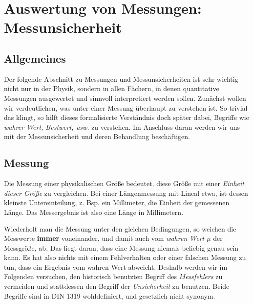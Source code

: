 \chapter{Auswertung von Messungen: Messunsicherheit} \label{v:fehler}

\section{Allgemeines}

Der folgende Abschnitt zu Messungen und Messunsicherheiten ist sehr wichtig nicht nur in der Physik, sondern in allen Fächern, in denen quantitative Messungen ausgewertet und sinnvoll interpretiert werden sollen. Zunächst wollen wir verdeutlichen, was unter einer Messung überhaupt zu verstehen ist. So trivial das klingt, so hilft dieses formalisierte Verständnis doch später dabei, Begriffe wie \textit{wahrer Wert, Bestwert, usw.} zu verstehen. Im Anschluss daran werden wir uns mit der Messunsicherheit und deren Behandlung beschäftigen.


\section{Messung}

Die Messung einer physikalischen Größe bedeutet, diese Größe mit einer \textit{Einheit dieser Größe} zu vergleichen. Bei einer Längenmessung mit Lineal etwa, ist dessen kleinste Untereinteilung, z. Bsp. ein Millimeter, die Einheit der gemessenen Länge. Das Messergebnis ist also eine Länge in Millimetern.

Wiederholt man die Messung unter den gleichen Bedingungen, so weichen die Messwerte \textbf{immer} voneinander, und damit auch vom \textit{wahren Wert $\mu$} der Messgröße, ab. Das liegt daran, dass eine Messung niemals beliebig genau sein kann. Es hat also nichts mit einem Fehlverhalten oder einer falschen Messung zu tun, dass ein Ergebnis vom wahren Wert abweicht. Deshalb werden wir im Folgenden versuchen, den historisch benutzten Begriff des \textit{Messfehlers} zu vermeiden und stattdessen den Begriff der \textit{Unsicherheit} zu benutzen. Beide Begriffe sind in DIN 1319 wohldefiniert, und gesetzlich nicht synonym.

